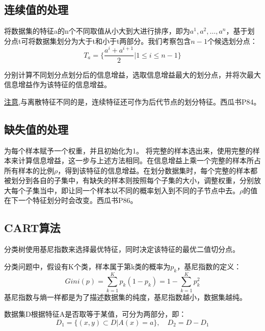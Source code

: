 \documentclass[UTF8]{ctexart} %
\begin{document}
		\subsection{连续值的处理}
			
			将数据集的特征a的n个不同取值从小大到大进行排序，即为${a^1,a^2,\dots,a^n}$，基于划分点t可将数据集划分为大于t和小于t两部分。我们考察包含$n-1$个候选划分点：\[T_a=\Big\{\frac{a^i+a^{i+1}}{2}|1\leq i\leq n-1\Big\}\]
		
			分别计算不同划分点划分后的信息增益，选取信息增益最大的划分点，并将次最大信息增益作为该特征的信息增益。
			
			\uline{注意},与离散特征不同的是，连续特征还可作为后代节点的划分特征。西瓜书P84。
			
		\subsection{缺失值的处理}
			为每个样本赋予一个权重，并且初始化为1。	
			将完整的样本选出来，使用完整的样本来计算信息增益，这一步与上述方法相同。在信息增益上乘一个完整的样本所占所有样本的比例$\rho$，得到该特征的信息增益。在划分数据集时，每个完整的样本都被划分到各自的子集中，有缺失的样本则按照每个子集的大小，调整权重，分别放大每个子集当中，即让同一个样本以不同的概率划入到不同的子节点中去。$\rho$的值在下一个特征划分时会改变。西瓜书P86。
		\subsection{CART算法}
			分类树使用基尼指数来选择最优特征，同时决定该特征的最优二值切分点。
			
			分类问题中，假设有K个类，样本属于第k类的概率为$p_k$，基尼指数的定义：
			\[Gini(p) = \sum_{k=1}^Kp_k(1-p_k)=1-\sum_{k=1}^Kp_k^2\]	
			基尼指数与熵一样都是为了描述数据集的纯度，基尼指数越小，数据集越纯。
			
			数据集D根据特征A是否取等于某值，可分为两部分，即：
			\[D_1=\{(x,y)\subset D|A(x)=a\},\quad D_2=D-D_1\]
			\begin{figure}[H]
			\end{figure}
\end{document}
